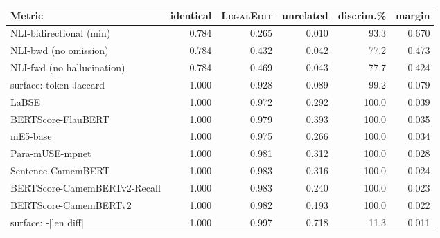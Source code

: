 \begin{tabular}{lrrrrr}
\toprule
Metric & identical & \textsc{LegalEdit} & unrelated & discrim.\% & margin \\
\midrule
NLI-bidirectional (min) & 0.784 & 0.265 & 0.010 & 93.3 & 0.670 \\
NLI-bwd (no omission) & 0.784 & 0.432 & 0.042 & 77.2 & 0.473 \\
NLI-fwd (no hallucination) & 0.784 & 0.469 & 0.043 & 77.7 & 0.424 \\
surface: token Jaccard & 1.000 & 0.928 & 0.089 & 99.2 & 0.079 \\
LaBSE & 1.000 & 0.972 & 0.292 & 100.0 & 0.039 \\
BERTScore-FlauBERT & 1.000 & 0.979 & 0.393 & 100.0 & 0.035 \\
mE5-base & 1.000 & 0.975 & 0.266 & 100.0 & 0.034 \\
Para-mUSE-mpnet & 1.000 & 0.981 & 0.312 & 100.0 & 0.028 \\
Sentence-CamemBERT & 1.000 & 0.983 & 0.316 & 100.0 & 0.024 \\
BERTScore-CamemBERTv2-Recall & 1.000 & 0.983 & 0.240 & 100.0 & 0.023 \\
BERTScore-CamemBERTv2 & 1.000 & 0.982 & 0.193 & 100.0 & 0.022 \\
surface: -|len diff| & 1.000 & 0.997 & 0.718 & 11.3 & 0.011 \\
\bottomrule
\end{tabular}